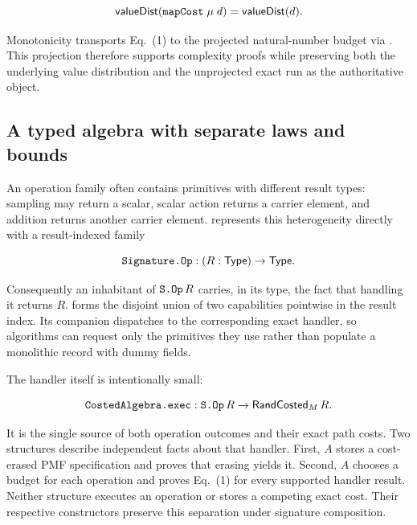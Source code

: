 \[
  \vDist(\decl{mapCost}\;\mu\;d)=\vDist(d).
\]

Monotonicity transports Eq.~(1) to the projected natural-number budget via
.  This projection therefore supports
complexity proofs while preserving both the underlying value distribution and
the unprojected exact run as the authoritative object.

\subsection{A typed algebra with separate laws and bounds}

An operation family often contains primitives with different result types:
sampling may return a scalar, scalar action returns a carrier element, and
addition returns another carrier element.   represents this
heterogeneity directly with a result-indexed family

\[
  \decl{Signature.Op} : (R:\mathsf{Type}) \to \mathsf{Type}.
\]

Consequently an inhabitant of \(\decl{S.Op}\,R\) carries, in its type, the fact
that handling it returns \(R\).   forms the disjoint union
of two capabilities pointwise in the result index.  Its companion
 dispatches to the corresponding exact handler, so
algorithms can request only the primitives they use rather than populate a
monolithic record with dummy fields.

The handler itself is intentionally small:

\[
  \decl{CostedAlgebra.exec} : \decl{S.Op}\,R \to
    \mathsf{RandCosted}_M\,R.
\]

It is the single source of both operation outcomes and their exact path costs.
Two structures describe independent facts about that handler.  First,
\(A\) stores a cost-erased PMF specification and proves that
erasing  yields it.  Second, \(A\) chooses a
budget for each operation and proves Eq.~(1) for every supported handler
result.  Neither structure executes an operation or stores a competing exact
cost.  Their respective  constructors preserve this separation
under signature composition.

